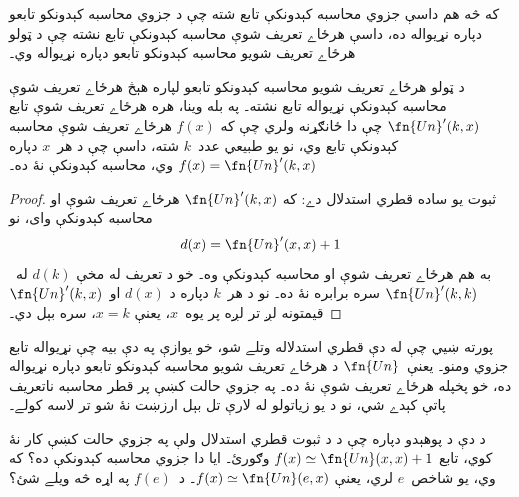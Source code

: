\documentclass[../../../include/open-logic-section]{subfiles}
\begin{document}

که څه هم داسې جزوي محاسبه کېدونکې تابع شته چې د جزوي محاسبه کېدونکو
تابعو دپاره نړيواله ده، داسې هرځاے تعريف شوې محاسبه کېدونکې تابع
نشته چې د ټولو هرځاے تعريف شويو محاسبه کېدونکو تابعو دپاره نړيواله
وي۔

\begin{thm}
د ټولو هرځاے تعريف شويو محاسبه کېدونکو تابعو لپاره هېڅ هرځاے تعريف
شوې محاسبه کېدونکې نړيواله تابع نشته۔ په بله وينا، هره هرځاے تعريف شوې تابع
$\fn{Un}'(k, x)$ چې دا ځانګړنه ولري چې که $f(x)$ هرځاے تعريف شوې
محاسبه کېدونکې تابع وي، نو يو طبيعي عدد~$k$ شته، داسې چې د هر~$x$
دپاره $f(x) = \fn{Un}'(k,x)$ وي، محاسبه کېدونکې نۀ ده۔
\end{thm}

\begin{proof}
ثبوت يو ساده قطري استدلال دے: که $\fn{Un}'(k,x)$ هرځاے تعريف شوې او
محاسبه کېدونکې وای، نو
\[
d(x) = \fn{Un}'(x, x) + 1
\]
به هم هرځاے تعريف شوې او محاسبه کېدونکې وه۔ خو د تعريف له مخې
$d(k)$ له~$\fn{Un}'(k,k)$ سره برابره نۀ ده۔ نو د هر~$k$ دپاره د
$d(x)$ او~$\fn{Un}'(k, x)$ قيمتونه لږ تر لږه پر يوه~$x$، يعنې
$x = k$، سره بېل دي۔
\end{proof}

\begin{explain}
پورته  ښيي چې له دې قطري استدلاله وتلے شو،
خو يوازې په دې بيه چې نړيواله تابع جزوي ومنو۔ يعنې~$\fn{Un}$ د هرځاے
تعريف شويو محاسبه کېدونکو تابعو دپاره نړيواله ده، خو پخپله هرځاے
تعريف شوې نۀ ده۔ په جزوي حالت کښې پر قطر محاسبه ناتعريف پاتې کېدے شي، نو د يو زياتولو له لارې
تل بېل ارزښت نۀ شو تر لاسه کولے۔
\end{explain}

\begin{prob}
  د دې د پوهېدو دپاره چې د  د ثبوت قطري استدلال
  ولې په جزوي حالت کښې کار نۀ کوي، تابع
  $f(x) \simeq \fn{Un}(x,x)+1$ وګورئ۔ ايا دا جزوي محاسبه کېدونکې
  ده؟ که وي، يو شاخص~$e$ لري، يعنې
  $f(x) \simeq \fn{Un}(e,x)$۔ د~$f(e)$ په اړه څه ويلے شئ؟
\end{prob}
\end{document}
